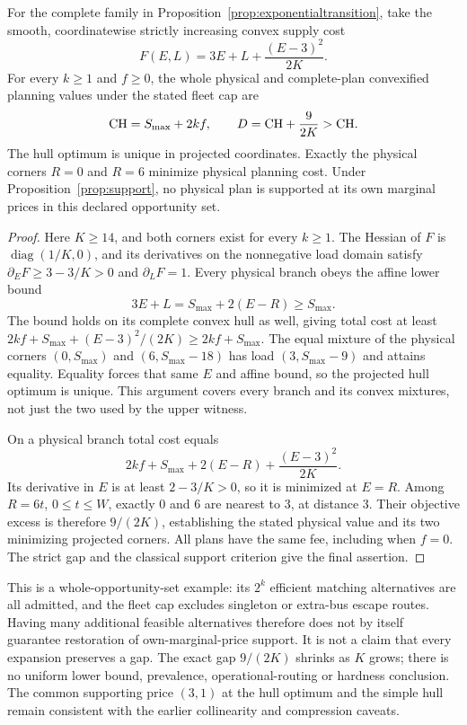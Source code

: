 \begin{corollary}
\label{cor:exponentialgap}
For the complete family in Proposition~\ref{prop:exponentialtransition},
take the smooth, coordinatewise strictly increasing convex supply cost
\[
 F(E,L)=3E+L+\frac{(E-3)^2}{2K}.
\]
For every $k\ge1$ and $f\ge0$, the whole physical and complete-plan
convexified planning values under the stated fleet cap are
\[
 \mathrm{CH}=S_{\max}+2kf,\qquad
 D=\mathrm{CH}+\frac{9}{2K}>\mathrm{CH}.
\]
The hull optimum is unique in projected coordinates. Exactly the physical
corners $R=0$ and $R=6$ minimize physical planning cost. Under
Proposition~\ref{prop:support}, no physical plan is supported at its own
marginal prices in this declared opportunity set.
\end{corollary}

\begin{proof}
Here $K\ge14$, and both corners exist for every $k\ge1$. The Hessian of
$F$ is $\operatorname{diag}(1/K,0)$, and its derivatives on the
nonnegative load domain satisfy $\partial_EF\ge3-3/K>0$ and
$\partial_LF=1$. Every physical branch obeys the affine lower bound
\[
 3E+L=S_{\max}+2(E-R)\ge S_{\max}.
\]
The bound holds on its complete convex hull as well, giving total cost
at least $2kf+S_{\max}+(E-3)^2/(2K)\ge2kf+S_{\max}$.
The equal mixture of the physical corners $(0,S_{\max})$ and
$(6,S_{\max}-18)$ has load $(3,S_{\max}-9)$ and attains equality.
Equality forces that same $E$ and affine bound, so the projected hull
optimum is unique. This argument covers every branch and its convex
mixtures, not just the two used by the upper witness.

On a physical branch total cost equals
\[
 2kf+S_{\max}+2(E-R)+\frac{(E-3)^2}{2K}.
\]
Its derivative in $E$ is at least $2-3/K>0$, so it is minimized at
$E=R$. Among $R=6t$, $0\le t\le W$, exactly 0 and 6 are nearest to 3,
at distance 3. Their objective excess is therefore $9/(2K)$, establishing
the stated physical value and its two minimizing projected corners.
All plans have the same fee, including when $f=0$. The strict gap and
the classical support criterion give the final assertion.
\end{proof}

This is a whole-opportunity-set example: its $2^k$ efficient matching
alternatives are all admitted, and the fleet cap excludes singleton or
extra-bus escape routes. Having many additional feasible alternatives
therefore does not by itself guarantee restoration of own-marginal-price
support. It is not a claim that every expansion preserves a gap. The
exact gap $9/(2K)$ shrinks as $K$ grows; there is no uniform lower bound,
prevalence, operational-routing or hardness conclusion. The common
supporting price $(3,1)$ at the hull optimum and the simple hull remain
consistent with the earlier collinearity and compression caveats.

